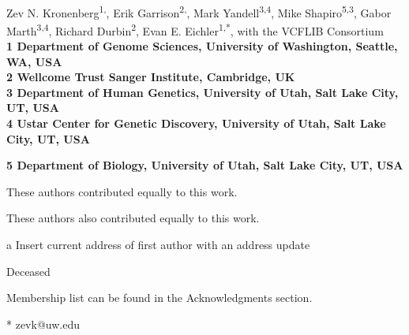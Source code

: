 \documentclass[10pt,letterpaper]{article}
\date{}
\begin{document}
\vspace*{0.35in}

\begin{flushleft}
{\Large
\textbf{}
}
\newline
\\
Zev N. Kronenberg\textsuperscript{1,\Yinyang},
Erik Garrison\textsuperscript{2,\Yinyang},
Mark Yandell\textsuperscript{3,4},
Mike Shapiro\textsuperscript{5,3},
Gabor Marth\textsuperscript{3,4},
Richard Durbin\textsuperscript{2},
Evan E. Eichler\textsuperscript{1,*},
with the VCFLIB Consortium\textsuperscript{\textpilcrow}
\\
\bigskip
\bf{1} Department of Genome Sciences, University of Washington, Seattle, WA, USA
\\
\bf{2} Wellcome Trust Sanger Institute, Cambridge, UK
\\
\bf{3} Department of Human Genetics, University of Utah, Salt Lake City, UT, USA
\\
\bf{4} Ustar Center for Genetic Discovery, University of Utah, Salt Lake City, UT, USA

\bf{5} Department of Biology, University of Utah, Salt Lake City, UT, USA
\\
\bigskip

% 
%
\Yinyang These authors contributed equally to this work.

\ddag These authors also contributed equally to this work.

\textcurrency a Insert current address of first author with an address update

\dag Deceased

\textpilcrow Membership list can be found in the Acknowledgments section.

* zevk@uw.edu

\end{flushleft}
\end{document}
